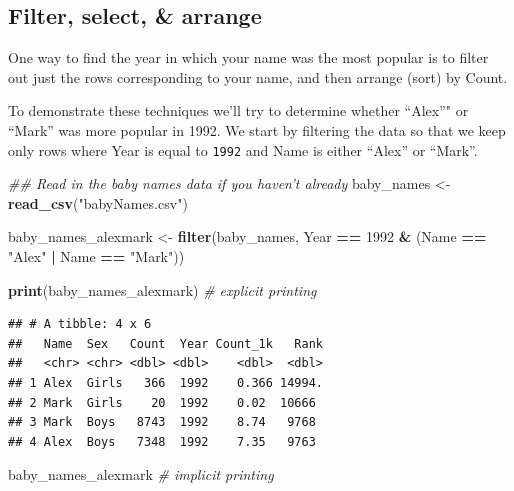 \documentclass[]{book}
\newenvironment{Shaded}{\begin{snugshade}}{\end{snugshade}}
\newcommand{\CommentTok}[1]{\textcolor[rgb]{0.56,0.35,0.01}{\textit{#1}}}
\newcommand{\DecValTok}[1]{\textcolor[rgb]{0.00,0.00,0.81}{#1}}
\newcommand{\KeywordTok}[1]{\textcolor[rgb]{0.13,0.29,0.53}{\textbf{#1}}}
\newcommand{\NormalTok}[1]{#1}
\newcommand{\OperatorTok}[1]{\textcolor[rgb]{0.81,0.36,0.00}{\textbf{#1}}}
\newcommand{\StringTok}[1]{\textcolor[rgb]{0.31,0.60,0.02}{#1}}
\begin{document}
\hypertarget{filter-select-arrange}{%
\subsection{Filter, select, \& arrange}\label{filter-select-arrange}}

One way to find the year in which your name was the most popular
is to filter out just the rows corresponding to your name, and
then arrange (sort) by Count.

To demonstrate these techniques we'll try to determine whether
``Alex''" or ``Mark'' was more popular in 1992. We start by filtering the
data so that we keep only rows where Year is equal to \texttt{1992} and Name is
either ``Alex'' or ``Mark''.

\begin{Shaded}
\begin{Highlighting}[]
\CommentTok{## Read in the baby names data if you haven't already}
\NormalTok{baby_names <-}\StringTok{ }\KeywordTok{read_csv}\NormalTok{(}\StringTok{"babyNames.csv"}\NormalTok{)}
\end{Highlighting}
\end{Shaded}

\begin{Shaded}
\begin{Highlighting}[]
\NormalTok{baby_names_alexmark <-}\StringTok{ }\KeywordTok{filter}\NormalTok{(baby_names, }
\NormalTok{             Year }\OperatorTok{==}\StringTok{ }\DecValTok{1992} \OperatorTok{&}\StringTok{ }\NormalTok{(Name }\OperatorTok{==}\StringTok{ "Alex"} \OperatorTok{|}\StringTok{ }\NormalTok{Name }\OperatorTok{==}\StringTok{ "Mark"}\NormalTok{))}

\KeywordTok{print}\NormalTok{(baby_names_alexmark) }\CommentTok{# explicit printing             }
\end{Highlighting}
\end{Shaded}

\begin{verbatim}
## # A tibble: 4 x 6
##   Name  Sex   Count  Year Count_1k   Rank
##   <chr> <chr> <dbl> <dbl>    <dbl>  <dbl>
## 1 Alex  Girls   366  1992    0.366 14994.
## 2 Mark  Girls    20  1992    0.02  10666 
## 3 Mark  Boys   8743  1992    8.74   9768 
## 4 Alex  Boys   7348  1992    7.35   9763
\end{verbatim}

\begin{Shaded}
\begin{Highlighting}[]
\NormalTok{baby_names_alexmark }\CommentTok{# implicit printing}
\end{Highlighting}
\end{Shaded}
\end{document}
